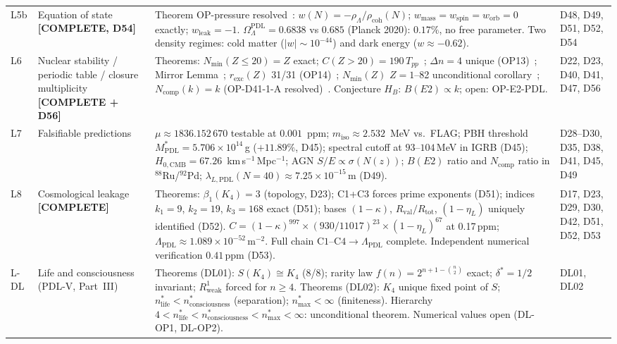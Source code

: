 \documentclass[11pt,a4paper]{article}
\newcommand{\Rval}{R_{\mathrm{val}}}
\theoremstyle{plain}
\theoremstyle{definition}
\theoremstyle{remark}
\newcommand{\Rtot}{R_{\mathrm{tot}}}
\newcommand{\Tpp}{T_{pp}}
\newcommand{\rhocoh}{\rho_{\mathrm{coh}}}
\begin{document}
\begin{longtable}{L{0.6cm}L{3.0cm}L{5.5cm}L{4.0cm}}
L5b & Equation of state \textbf{[COMPLETE, D54]} & \textcolor{proofblue}{Theorem} OP-pressure resolved~\cite{D54}: $w(N) = -\rho_\Lambda/\rhocoh(N)$; $w_{\mathrm{mass}}=w_{\mathrm{spin}}=w_{\mathrm{orb}}=0$ exactly; $w_{\mathrm{leak}}=-1$. $\Omega_\Lambda^{\mathrm{PDL}}=0.6838$ vs $0.685$ (Planck 2020): $0.17\%$, no free parameter. Two density regimes: cold matter ($|w|\sim 10^{-44}$) and dark energy ($w \approx -0.62$). & D48, D49, D51, D52, D54\\[0.4em]
L6 & Nuclear stability / periodic table / closure multiplicity \textbf{[COMPLETE + D56]} & \textcolor{proofblue}{Theorems}: $N_{\min}(Z\leq20)=Z$ exact; $C(Z>20)=190\,\Tpp$~\cite{D40}; $\Delta n=4$ unique (OP13)~\cite{D47}; Mirror Lemma~\cite{D47}; $r_{\mathrm{exc}}(Z)$ 31/31 (OP14)~\cite{D47}; $N_{\min}(Z)$ $Z=1$--82 unconditional corollary~\cite{D47}; $N_{\mathrm{comp}}(k)=k$ (OP-D41-1-A resolved)~\cite{D56}. \textcolor{conjecturegreen}{Conjecture} $H_B$: $B(E2)\propto k$; open: OP-E2-PDL. & D22, D23, D40, D41, D47, D56\\[0.4em]
L7 & Falsifiable predictions & $\mu\approx 1836.152\,670$ testable at $0.001$~ppm; $m_{\mathrm{iso}}\approx 2.532$~MeV vs.\ FLAG; PBH threshold $M^*_{\mathrm{PDL}}=5.706\times10^{14}$\,g ($+11.89\%$, D45); spectral cutoff at $93$--$104$\,MeV in IGRB (D45); $H_{0,\mathrm{CMB}}=67.26$~km\,s$^{-1}$\,Mpc$^{-1}$; AGN $S/E \propto \sigma(N(z))$; $B(E2)$ ratio and $N_{\mathrm{comp}}$ ratio in $^{88}$Ru/$^{92}$Pd; $\lambda_{L,\mathrm{PDL}}(N=40) \approx 7.25\times10^{-15}$\,m (D49). & D28--D30, D35, D38, D41, D45, D49\\[0.3em]
L8 & Cosmological leakage \textbf{[COMPLETE]} & \textcolor{proofblue}{Theorems}: $\beta_1(K_4)=3$ (topology, D23); C1+C3 forces prime exponents (D51); indices $k_1=9$, $k_2=19$, $k_3=168$ exact (D51); bases $(1-\kappa)$, $\Rval/\Rtot$, $(1-\eta_L)$ uniquely identified (D52). $C=(1-\kappa)^{997}\times(930/11017)^{23}\times(1-\eta_L)^{67}$ at 0.17\,ppm; $\Lambda_{\mathrm{PDL}}\approx 1.089\times10^{-52}$\,m$^{-2}$. Full chain $\mathrm{C1\text{--}C4}\to\Lambda_{\mathrm{PDL}}$ complete. Independent numerical verification $0.41$\,ppm (D53). & D17, D23, D29, D30, D42, D51, D52, D53\\[0.3em]
L-DL & Life and consciousness (PDL-V, Part~III) & \textcolor{proofblue}{Theorems} (DL01): $S(K_4)\cong K_4$ (8/8); rarity law $f(n)=2^{n+1-\binom{n}{2}}$ exact; $\delta^*=1/2$ invariant; $R^1_{\mathrm{weak}}$ forced for $n\geq 4$. \textcolor{proofblue}{Theorems} (DL02): $K_4$ unique fixed point of $S$; $n^*_{\mathrm{life}} < n^*_{\mathrm{consciousness}}$ (separation); $n^*_{\mathrm{max}}<\infty$ (finiteness). Hierarchy $4 < n^*_{\mathrm{life}} < n^*_{\mathrm{consciousness}} < n^*_{\mathrm{max}} < \infty$: unconditional theorem. Numerical values open (DL-OP1, DL-OP2). & DL01, DL02\\[0.3em]

\end{longtable}
\end{document}
